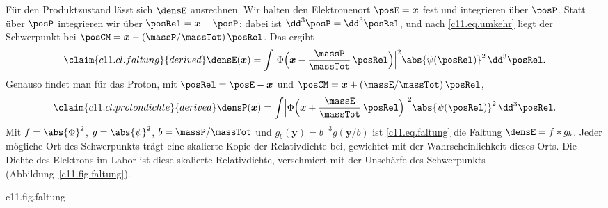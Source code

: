 Für den Produktzustand lässt sich $\densE$ ausrechnen. Wir halten den Elektronenort
$\posE = \boldsymbol{x}$ fest und integrieren über $\posP$. Statt über $\posP$
integrieren wir über $\posRel = \boldsymbol{x} - \posP$; dabei ist
$\dd^3\posP = \dd^3\posRel$, und nach \eqref{c11.eq.umkehr} liegt der Schwerpunkt bei
$\posCM = \boldsymbol{x} - (\massP/\massTot)\,\posRel$. Das ergibt
\begin{equation}\label{c11.eq.faltung}\claim{c11.cl.faltung}{derived}
  \densE(\boldsymbol{x})
  = \int \Bigl\lvert \Phi\Bigl(\boldsymbol{x} - \frac{\massP}{\massTot}\,\posRel\Bigr)
    \Bigr\rvert^2 \abs{\psi(\posRel)}^2 \,\dd^3\posRel .
\end{equation}
Genauso findet man für das Proton, mit $\posRel = \posE - \boldsymbol{x}$ und
$\posCM = \boldsymbol{x} + (\massE/\massTot)\,\posRel$,
\begin{equation}\label{c11.eq.protondichte}\claim{c11.cl.protondichte}{derived}
  \densP(\boldsymbol{x})
  = \int \Bigl\lvert \Phi\Bigl(\boldsymbol{x} + \frac{\massE}{\massTot}\,\posRel\Bigr)
    \Bigr\rvert^2 \abs{\psi(\posRel)}^2 \,\dd^3\posRel .
\end{equation}
Mit $f = \abs{\Phi}^2$, $g = \abs{\psi}^2$, $b = \massP/\massTot$ und
$g_b(\boldsymbol{y}) = b^{-3}g(\boldsymbol{y}/b)$ ist \eqref{c11.eq.faltung} die
Faltung $\densE = f * g_b$. Jeder mögliche Ort des Schwerpunkts trägt eine skalierte
Kopie der Relativdichte bei, gewichtet mit der Wahrscheinlichkeit dieses Orts. Die
Dichte des Elektrons im Labor ist diese skalierte Relativdichte, verschmiert mit der
Unschärfe des Schwerpunkts (Abbildung~\ref{c11.fig.faltung}).

\begin{tpcfigure}{c11.fig.faltung}
  \caption{Die Faltung \eqref{c11.eq.faltung} entlang einer Geraden durch die Mitte des
    Schwerpunktpakets, für $\Znuc = 1$. Dünn durchgezogen: die Relativdichte
    $\abs{\psinlm{1}{0}{0}}^2$ des Zustands 1s aus Abschnitt~\ref{c11.s5}. Gestrichelt:
    die Dichte $\abs{\Phi}^2$ eines Schwerpunktpakets in Form einer Glockenkurve; ihre
    Breite, $\num[c11.cl.wolke]{0{,}7}{}$ Längeneinheiten, ist für das Bild gewählt.
    Dick: die Dichte $\densE$ des Elektrons im Labor. Sie ist breiter und flacher als
    beide. Am markierten Punkt, eine Längeneinheit von der Mitte, ist
    $\densE\,\aRed^3 = \num[c11.cl.wolke]{0{,}0379}{}$. Längeneinheit ist der Bohrsche
    Radius $\aRed$ mit reduzierter Masse aus Abschnitt~\ref{c11.s4}.}
\end{tpcfigure}

